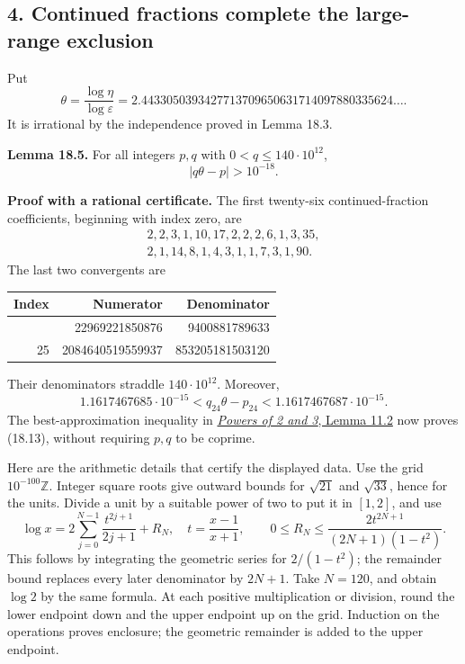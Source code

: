 \documentclass[
  11pt,
  a4paper,
]{article}
\newcounter{none} %
\begin{document}
\subsection{4. Continued fractions complete the large-range
exclusion}\label{continued-fractions-complete-the-large-range-exclusion}

Put \[
 \theta=\frac{\log\eta}{\log\varepsilon}
 =2.4433050393427713709650631714097880335624\ldots.
 \tag{18.12}
\] It is irrational by the independence proved in Lemma 18.3.

\textbf{Lemma 18.5.} For all integers \(p,q\) with
\(0<q\le140\cdot10^{12}\), \[
 |q\theta-p|>10^{-18}.
 \tag{18.13}
\]

\textbf{Proof with a rational certificate.} The first twenty-six
continued-fraction coefficients, beginning with index zero, are \[
 \begin{gathered}
 2,2,3,1,10,17,2,2,2,6,1,3,35,\\
 2,1,14,8,1,4,3,1,1,7,3,1,90.
 \end{gathered}
 \tag{18.14}
\] The last two convergents are

{\def\LTcaptype{none} %
\begin{longtable}[]{@{}rrr@{}}
\toprule\noalign{}
Index & Numerator & Denominator \\
\midrule\noalign{}
\endhead
\bottomrule\noalign{}
\endlastfoot
24 & 22969221850876 & 9400881789633 \\
25 & 2084640519559937 & 853205181503120 \\
\end{longtable}
}

Their denominators straddle \(140\cdot10^{12}\). Moreover, \[
 1.1617467685\cdot10^{-15}
 <q_{24}\theta-p_{24}
 <1.1617467687\cdot10^{-15}.
 \tag{18.15}
\] The best-approximation inequality in
\href{https://kokunoyumeto.github.io/open-math-courses-public/courses/TR-BAKER/src/TR-BAKER-11.md}{\emph{Powers of 2 and 3}, Lemma 11.2} now proves
(18.13), without requiring \(p,q\) to be coprime.

Here are the arithmetic details that certify the displayed data. Use the
grid \(10^{-100}\mathbb Z\). Integer square roots give outward bounds
for \(\sqrt{21}\) and \(\sqrt{33}\), hence for the units. Divide a unit
by a suitable power of two to put it in \([1,2]\), and use \[
 \log x=2\sum_{j=0}^{N-1}\frac{t^{2j+1}}{2j+1}+R_N,
 \quad t=\frac{x-1}{x+1},\qquad
 0\le R_N\le\frac{2t^{2N+1}}{(2N+1)(1-t^2)}.
 \tag{18.16}
\] This follows by integrating the geometric series for \(2/(1-t^2)\);
the remainder bound replaces every later denominator by \(2N+1\). Take
\(N=120\), and obtain \(\log2\) by the same formula. At each positive
multiplication or division, round the lower endpoint down and the upper
endpoint up on the grid. Induction on the operations proves enclosure;
the geometric remainder is added to the upper endpoint.
\end{document}
